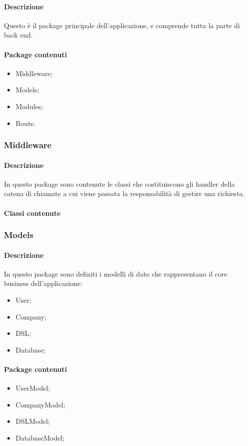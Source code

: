 \paragraph{Descrizione}
Questo è il package principale dell'applicazione, e comprende tutta la parte di back end.
\paragraph{Package contenuti}
\begin{itemize}
\item Middleware;
\item Models;
\item Modules;
\item Route.
\end{itemize}

\subsubsection{Middleware}
\paragraph{Descrizione}
In questo package sono contenute le classi che costituiscono gli handler della catena di chiamate a cui viene passata la responsabilità di gestire una richiesta.
\paragraph{Classi contenute}

\subsubsection{Models}
\paragraph{Descrizione}
In questo package sono definiti i modelli di dato che rappresentano il core business dell'applicazione:
\begin{itemize}
\item User;
\item Company;
\item DSL;
\item Database;
\end{itemize}
\paragraph{Package contenuti}
\begin{itemize}
\item UserModel;
\item CompanyModel;
\item DSLModel;
\item DatabaseModel;
\end{itemize}

